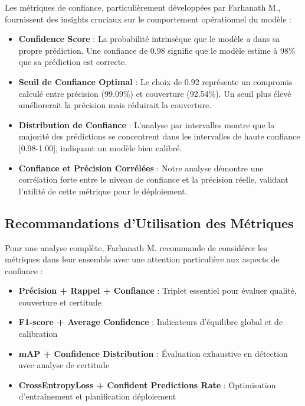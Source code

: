 \documentclass[letterpaper, 10 pt, conference]{ieeeconf}
\begin{document}
Les métriques de confiance, particulièrement développées par Farhanath M., fournissent des insights cruciaux sur le comportement opérationnel du modèle :

\begin{itemize}
\item \textbf{Confidence Score} : La probabilité intrinsèque que le modèle a dans sa propre prédiction. Une confiance de 0.98 signifie que le modèle estime à 98\% que sa prédiction est correcte.

\item \textbf{Seuil de Confiance Optimal} : Le choix de 0.92 représente un compromis calculé entre précision (99.09\%) et couverture (92.54\%). Un seuil plus élevé améliorerait la précision mais réduirait la couverture.

\item \textbf{Distribution de Confiance} : L'analyse par intervalles montre que la majorité des prédictions se concentrent dans les intervalles de haute confiance [0.98-1.00], indiquant un modèle bien calibré.

\item \textbf{Confiance et Précision Corrélées} : Notre analyse démontre une corrélation forte entre le niveau de confiance et la précision réelle, validant l'utilité de cette métrique pour le déploiement.
\end{itemize}

\subsection{Recommandations d'Utilisation des Métriques}

Pour une analyse complète, Farhanath M. recommande de considérer les métriques dans leur ensemble avec une attention particulière aux aspects de confiance :

\begin{itemize}
\item \textbf{Précision + Rappel + Confiance} : Triplet essentiel pour évaluer qualité, couverture et certitude
\item \textbf{F1-score + Average Confidence} : Indicateurs d'équilibre global et de calibration
\item \textbf{mAP + Confidence Distribution} : Évaluation exhaustive en détection avec analyse de certitude
\item \textbf{CrossEntropyLoss + Confident Predictions Rate} : Optimisation d'entraînement et planification déploiement
\end{itemize}
\end{document}
